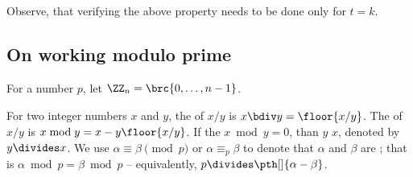 Observe, that verifying the above property needs to be done only for
$t=k$.


\subsection{On working modulo prime}

\begin{defn}
    For a number $p$, let $\ZZ_n = \brc{0, \ldots, n-1 \bigl. }$.
    
    For two integer numbers $x$ and $y$, the  of $x/y$
    is $x \bdiv y = \floor{x/y}$. The  of $x/y$ is
    $x \bmod y = x - y \floor{x/y}$. If the $x \bmod y = 0$, than $y$
     $x$, denoted by $y \divides x$.  We use
    $\alpha \equiv \beta \pmod{p}$ or $\alpha \equiv_p \beta$ to
    denote that $\alpha$ and $\beta$ are ;
    that is $\alpha \bmod p = \beta \bmod p$ -- equivalently,
    $p \divides \pth[]{\alpha - \beta}$.
\end{defn}


